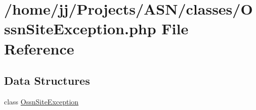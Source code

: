 \hypertarget{_ossn_site_exception_8php}{}\section{/home/jj/\+Projects/\+A\+S\+N/classes/\+Ossn\+Site\+Exception.php File Reference}
\label{_ossn_site_exception_8php}
\subsection*{Data Structures}
\begin{DoxyCompactItemize}
\item 
class \hyperlink{class_ossn_site_exception}{Ossn\+Site\+Exception}
\end{DoxyCompactItemize}
